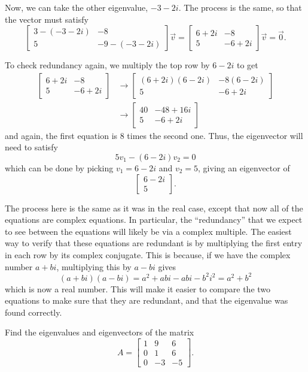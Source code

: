 \begin{exampleSol}
Now, we can take the other eigenvalue, $-3-2i$. The process is the same, so that the vector must satisfy
\[\begin{bmatrix} 3-(-3-2i) & -8 \\ 5 & -9-(-3-2i) \end{bmatrix}\vec{v} = \begin{bmatrix} 6+2i & -8 \\ 5 & -6+2i \end{bmatrix}\vec{v} = \vec{0}. \]

To check redundancy again, we multiply the top row by $6-2i$ to get  
\[ \begin{split}
 \begin{bmatrix} 6+2i & -8 \\ 5 & -6+2i \end{bmatrix} &\rightarrow  \begin{bmatrix} (6+2i)(6-2i) & -8(6-2i) \\ 5 & -6+2i \end{bmatrix} \\
 &\rightarrow \begin{bmatrix} 40 & -48 + 16i \\ 5 & -6+2i \end{bmatrix}
\end{split} \] and again, the first equation is 8 times the second one. Thus, the eigenvector will need to satisfy \[ 5v_1 - (6 - 2i)v_2 = 0\] which can be done by picking $v_1 = 6-2i$ and $v_2 = 5$, giving an eigenvector of
\[ \begin{bmatrix} 6-2i \\ 5 \end{bmatrix}. \]
\end{exampleSol}

The process here is the same as it was in the real case, except that now all of the equations are complex equations. In particular, the ``redundancy'' that we expect to see between the equations will likely be via a complex multiple. The easiest way to verify that these equations are redundant is by multiplying the first entry in each row by its complex conjugate. This is because, if we have the complex number $a + bi$, multiplying this by $a-bi$ gives
\[ (a+bi)(a-bi) = a^2 + abi - abi - b^2i^2 = a^2 + b^2 \] which is now a real number. This will make it easier to compare the two equations to make sure that they are redundant, and that the eigenvalue was found correctly.

\begin{example}
Find the eigenvalues and eigenvectors of the matrix
\[ A = \begin{bmatrix} 1 & 9 & 6 \\ 0 & 1 & 6 \\ 0 & -3 & -5 \end{bmatrix}.\]
\end{example}

